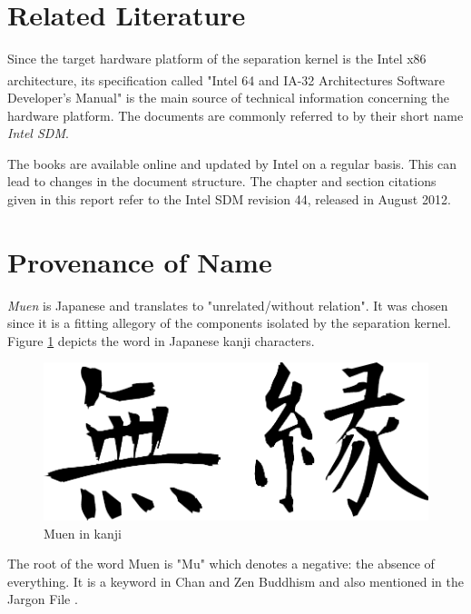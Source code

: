 \section{Related Literature}
Since the target hardware platform of the separation kernel is the Intel x86
architecture, its specification called "Intel\textsuperscript{\textregistered}
64 and IA-32 Architectures Software Developer's Manual"
\cite{IntelSDM} is the main source of technical information
concerning the hardware platform. The documents are commonly referred to by
their short name \emph{Intel SDM}.

The books are available online and updated by Intel on a regular basis. This
can lead to changes in the document structure. The chapter and section
citations given in this report refer to the Intel SDM revision 44, released in
August 2012.

\section{Provenance of Name}
\emph{Muen} is Japanese and translates to "unrelated/without
relation". It was chosen since it is a fitting allegory of the components
isolated by the separation kernel. Figure \ref{fig:muen} depicts the word in
Japanese kanji characters.

\begin{figure}[h]
	\centering
	\includegraphics[scale=0.4]{images/muen.pdf}
	\caption{Muen in kanji}
	\label{fig:muen}
\end{figure}

The root of the word Muen is "Mu" which denotes a negative: the absence of
everything. It is a keyword in Chan and Zen Buddhism and also mentioned in the
Jargon File \cite{jargonfile}.
